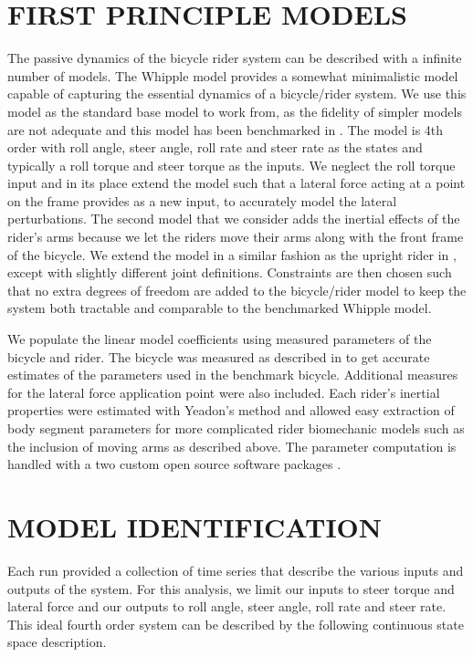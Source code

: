 \documentclass[twocolumn,10pt]{asme2e}
\begin{document}
\section*{FIRST PRINCIPLE MODELS}
The passive dynamics of the bicycle rider system can be described with a
infinite number of models. The Whipple model \cite{Whipple1899} provides a
somewhat minimalistic model capable of capturing the essential dynamics of a
bicycle/rider system. We use this model as the standard base model to work
from, as the fidelity of simpler models are not adequate and this model has
been benchmarked in \cite{Meijaard2007,Basu-Mandal2007}. The model is 4th order
with roll angle, steer angle, roll rate and steer rate as the states and
typically a roll torque and steer torque as the inputs. We neglect the roll
torque input and in its place extend the model such that a lateral force acting
at a point on the frame provides as a new input, to accurately model the
lateral perturbations. The second model that we consider adds the inertial
effects of the rider's arms because we let the riders move their arms along
with the front frame of the bicycle. We extend the model in a similar fashion
as the upright rider in \cite{Schwab2012}, except with slightly different joint
definitions.  Constraints are then chosen such that no extra degrees of freedom
are added to the bicycle/rider model to keep the system both tractable and
comparable to the benchmarked Whipple model.

We populate the linear model coefficients using measured parameters of the
bicycle and rider. The bicycle was measured as described in \cite{Moore2010} to
get accurate estimates of the parameters used in the benchmark bicycle.
Additional measures for the lateral force application point were also included.
Each rider's inertial properties were estimated with Yeadon's method
\cite{Yeadon1990a} and allowed easy extraction of body segment parameters for
more complicated rider biomechanic models such as the inclusion of moving arms
as described above. The parameter computation is handled with a two custom open
source software packages \cite{Moore2011a,Dembia2011}.

\section*{MODEL IDENTIFICATION}
Each run provided a collection of time series that describe the various inputs
and outputs of the system. For this analysis, we limit our inputs to steer
torque and lateral force and our outputs to roll angle, steer angle, roll rate
and steer rate. This ideal fourth order system can be described by the
following continuous state space description.
\end{document}
